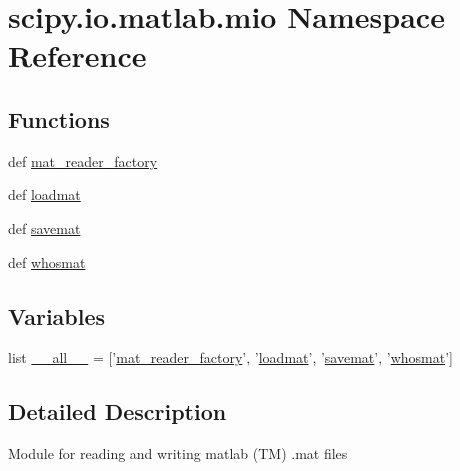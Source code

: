 \hypertarget{namespacescipy_1_1io_1_1matlab_1_1mio}{}\section{scipy.\+io.\+matlab.\+mio Namespace Reference}
\label{namespacescipy_1_1io_1_1matlab_1_1mio}
\subsection*{Functions}
\begin{DoxyCompactItemize}
\item 
def \hyperlink{namespacescipy_1_1io_1_1matlab_1_1mio_a9075c4a7be0081e31fa4ef749ad9fc0c}{mat\+\_\+reader\+\_\+factory}
\item 
def \hyperlink{namespacescipy_1_1io_1_1matlab_1_1mio_a4194c31ad8bc64ab0ae7b3d61cd43620}{loadmat}
\item 
def \hyperlink{namespacescipy_1_1io_1_1matlab_1_1mio_a87664a36655f0316bf9fd175ca12ac84}{savemat}
\item 
def \hyperlink{namespacescipy_1_1io_1_1matlab_1_1mio_a66a80b5ea40382d1c3752fec6bdb0f3f}{whosmat}
\end{DoxyCompactItemize}
\subsection*{Variables}
\begin{DoxyCompactItemize}
\item 
list \hyperlink{namespacescipy_1_1io_1_1matlab_1_1mio_a287651cfeed6880351e4d63199eb9aa4}{\+\_\+\+\_\+all\+\_\+\+\_\+} = \mbox{[}'\hyperlink{namespacescipy_1_1io_1_1matlab_1_1mio_a9075c4a7be0081e31fa4ef749ad9fc0c}{mat\+\_\+reader\+\_\+factory}', '\hyperlink{namespacescipy_1_1io_1_1matlab_1_1mio_a4194c31ad8bc64ab0ae7b3d61cd43620}{loadmat}', '\hyperlink{namespacescipy_1_1io_1_1matlab_1_1mio_a87664a36655f0316bf9fd175ca12ac84}{savemat}', '\hyperlink{namespacescipy_1_1io_1_1matlab_1_1mio_a66a80b5ea40382d1c3752fec6bdb0f3f}{whosmat}'\mbox{]}
\end{DoxyCompactItemize}


\subsection{Detailed Description}
\begin{DoxyVerb}Module for reading and writing matlab (TM) .mat files
\end{DoxyVerb}
 

